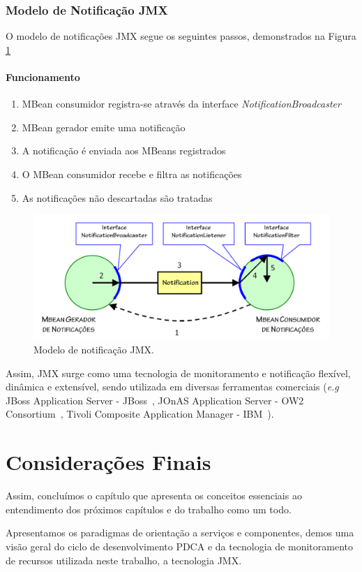 \subsubsection{Modelo de Notificação JMX}
O modelo de notificações JMX segue os seguintes passos, demonstrados na Figura \ref{fig:notifyjmx}

\paragraph{Funcionamento} 
\begin{enumerate}
\item MBean consumidor registra-se através da interface \textit{NotificationBroadcaster}

\item MBean gerador emite uma notificação

\item A notificação é enviada aos MBeans registrados

\item O MBean consumidor recebe e filtra as notificações

\item As notificações não descartadas são tratadas
\end{enumerate}

\begin{figure}[htp]
\centering
\includegraphics[width=13cm]{chapters/chapter2/notification_model.png}
\caption[Modelo de notificação JMX]{Modelo de notificação JMX.}
\label{fig:notifyjmx}
\end{figure}

Assim, JMX surge como uma tecnologia de monitoramento e notificação flexível, dinâmica e extensível, sendo utilizada em diversas ferramentas comerciais (\textit{e.g } JBoss Application Server - JBoss~\cite{jboss}, JOnAS Application Server - OW2 Consortium~\cite{jonas}, Tivoli Composite Application Manager - IBM~\cite{tivoli}). 

\section{Considerações Finais}
Assim, concluímos o capítulo que apresenta os conceitos essenciais ao entendimento dos próximos capítulos e do trabalho como um todo.

Apresentamos os paradigmas de orientação a serviços e componentes, demos uma visão geral do ciclo de desenvolvimento PDCA e da tecnologia de monitoramento de recursos utilizada neste trabalho, a tecnologia JMX.